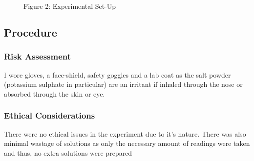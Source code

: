\documentclass{article}
\begin{document}
\begin{figure}[!h]
    \centering
    \qquad
    \caption*{Figure 2: Experimental Set-Up}%
    \label{fig:example}%
\end{figure}
\FloatBarrier

\subsection{Procedure}

\subsubsection{Risk Assessment}

\par{I wore gloves, a face-shield, safety goggles and a lab coat as the salt powder (potassium sulphate in particular) are an irritant if inhaled through the nose or absorbed through the skin or eye.}

\subsubsection{Ethical Considerations}

\par{There were no ethical issues in the experiment due to it's nature. There was also minimal wastage of solutions as only the necessary amount of readings were taken and thus, no extra solutions were prepared}
\end{document}
